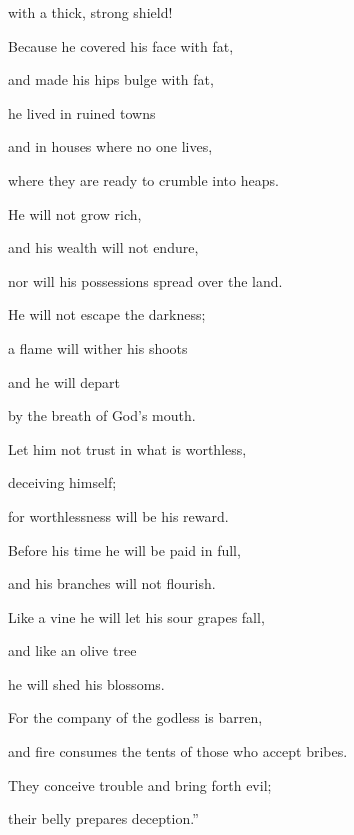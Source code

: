 {\par }{\Q with a thick,
strong
shield!
\par }{\Q {}Because
he covered
his face
with fat,
\par }{\Q and made
his hips
bulge with fat,
\par }{\Q {}he lived
in ruined
towns
\par }{\Q and in houses
where no
one lives,
\par }{\Q where
they are ready to crumble
into heaps.
\par }{\Q {}He will not
grow rich,
\par }{\Q and his
wealth
will not
endure,
\par }{\Q nor will his possessions
spread
over the land.
\par }{\Q {}He will not
escape
the darkness;
\par }{\Q a flame
will wither
his shoots
\par }{\Q and he will depart
\par }{\Q by the breath
of God’s mouth.
\par }{\Q {}Let him not
trust
in what is worthless,
\par }{\Q deceiving
himself;
\par }{\Q for
worthlessness
will be
his reward.
\par }{\Q {}Before his time
he will be paid in full,
\par }{\Q and his branches
will not
flourish.
\par }{\Q {}Like a vine
he will let his sour grapes
fall,

\par }{\Q and like an olive
tree
\par }{\Q he will shed his blossoms.
\par }{\Q {}For
the company
of the godless
is barren,
\par }{\Q and fire
consumes
the tents
of those who accept bribes.
\par }{\Q {}They conceive
trouble
and bring forth
evil;
\par }{\Q their belly
prepares
deception.”


\par }
